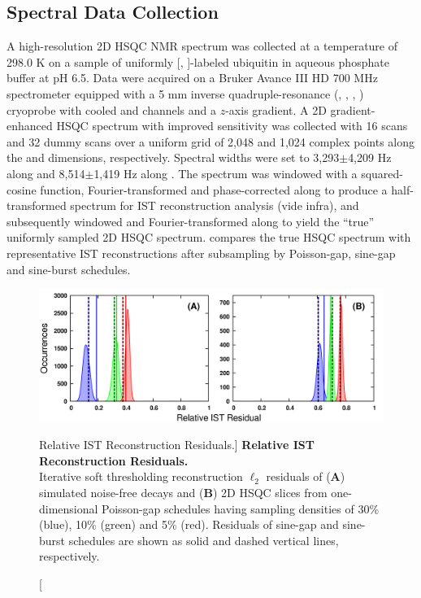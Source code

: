 \subsection{Spectral Data Collection}

\begin{doublespace}
A high-resolution 2D \hnnmr{} HSQC NMR spectrum was collected at a temperature
of 298.0 K on a sample of uniformly [\nnmr{}, \cnmr{}]-labeled ubiquitin in
aqueous phosphate buffer at pH 6.5. Data were acquired on a Bruker Avance
III HD 700 MHz spectrometer equipped with a 5 mm inverse quadruple-resonance
(\hnmr{}, \cnmr{}, \nnmr{}, \pnmr{}) cryoprobe with cooled \hnmr{} and \cnmr{}
channels and a $z$-axis gradient. A 2D gradient-enhanced \hnnmr{} HSQC spectrum
with improved sensitivity \cite{kay:jacs1992,palmer:jmr1991} was collected with
16 scans and 32 dummy scans over a uniform grid of 2,048 and 1,024 complex
points along the \hnmr{} and \nnmr{} dimensions, respectively. Spectral widths
were set to 3,293$\pm$4,209 Hz along \hnmr{} and 8,514$\pm$1,419 Hz along
\nnmr{}. The spectrum was windowed with a squared-cosine function,
Fourier-transformed and phase-corrected along \hnmr{} to produce a
half-transformed spectrum for IST reconstruction analysis (vide infra),
and subsequently windowed and Fourier-transformed along \nnmr{} to yield the
``true'' uniformly sampled 2D \hnnmr{} HSQC spectrum.
 compares the true HSQC spectrum with
representative IST reconstructions after subsampling by
Poisson-gap, sine-gap and sine-burst schedules.
\end{doublespace}

\begin{figure}[ht!]
\includegraphics[width=6in]{figs/dgs/07-residuals.png}
\caption
      [Relative IST Reconstruction Residuals.]{
  {\bf Relative IST Reconstruction Residuals.}
  \\
  Iterative soft thresholding reconstruction $\ell_2$ residuals of ({\bf A})
  simulated noise-free decays and ({\bf B}) 2D \hnnmr{} HSQC slices from
  one-dimensional Poisson-gap schedules having sampling densities of
  30\% (blue), 10\% (green) and 5\% (red). Residuals of sine-gap and sine-burst
  schedules are shown as solid and dashed vertical lines, respectively.
}
\label{figure.2.7}
\end{figure}

